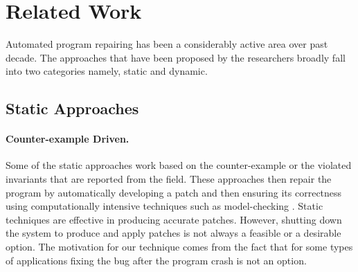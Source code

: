 \section{Related Work}
\label{sec:relatedWork}

Automated program repairing has been a considerably active
area over past decade. The approaches that have been proposed by the researchers
broadly fall into two categories namely, static and dynamic.

\subsection{Static Approaches}
\paragraph{Counter-example Driven.}
Some of the static approaches work based on the counter-example or the violated
invariants that are reported from the field. These approaches then repair the
program by automatically developing a patch and then ensuring its correctness
using computationally intensive techniques such as model-checking
\cite{biere2014, wei-issta-2010}. Static techniques are effective in producing accurate patches.
However, shutting down the system to produce and apply patches is not always a feasible or
a desirable option. The motivation for our technique comes from the fact that for some types of
applications fixing the bug after the program crash is not an option.

